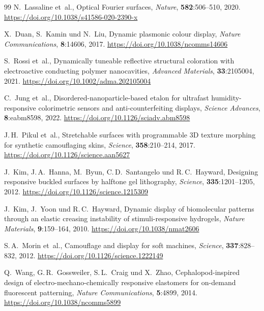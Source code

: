 ﻿\documentclass[a4paper,12pt]{article}
\theoremstyle{definition}
\begin{document}
\begin{thebibliography}{99}
		N.~Lassaline et~al.,
		\newblock Optical {Fourier} surfaces,
		\newblock \emph{Nature}, \textbf{582}:506--510, 2020.
		\newblock \url{https://doi.org/10.1038/s41586-020-2390-x}
		
		X.~Duan, S.~Kamin und N.~Liu,
		\newblock Dynamic plasmonic colour display,
		\newblock \emph{Nature Communications}, \textbf{8}:14606, 2017.
		\newblock \url{https://doi.org/10.1038/ncomms14606}
		
		S.~Rossi et~al.,
		\newblock Dynamically tuneable reflective structural coloration with
		electroactive conducting polymer nanocavities,
		\newblock \emph{Advanced Materials}, \textbf{33}:2105004, 2021.
		\newblock \url{https://doi.org/10.1002/adma.202105004}
		
		C.~Jung et~al.,
		\newblock Disordered-nanoparticle-based etalon for ultrafast
		humidity-responsive colorimetric sensors and anti-counterfeiting displays,
		\newblock \emph{Science Advances}, \textbf{8}:eabm8598, 2022.
		\newblock \url{https://doi.org/10.1126/sciadv.abm8598}
		
		
		J.\,H.~Pikul et~al.,
		\newblock Stretchable surfaces with programmable {3D} texture morphing for
		synthetic camouflaging skins,
		\newblock \emph{Science}, \textbf{358}:210--214, 2017.
		\newblock \url{https://doi.org/10.1126/science.aan5627}
		
		J.~Kim, J.\,A.~Hanna, M.~Byun, C.\,D.~Santangelo und R.\,C.~Hayward,
		\newblock Designing responsive buckled surfaces by halftone gel lithography,
		\newblock \emph{Science}, \textbf{335}:1201--1205, 2012.
		\newblock \url{https://doi.org/10.1126/science.1215309}
		
		J.~Kim, J.~Yoon und R.\,C.~Hayward,
		\newblock Dynamic display of biomolecular patterns through an elastic creasing
		instability of stimuli-responsive hydrogels,
		\newblock \emph{Nature Materials}, \textbf{9}:159--164, 2010.
		\newblock \url{https://doi.org/10.1038/nmat2606}
		
		S.\,A.~Morin et~al.,
		\newblock Camouflage and display for soft machines,
		\newblock \emph{Science}, \textbf{337}:828--832, 2012.
		\newblock \url{https://doi.org/10.1126/science.1222149}
		
		Q.~Wang, G.\,R.~Gossweiler, S.\,L.~Craig und X.~Zhao,
		\newblock Cephalopod-inspired design of electro-mechano-chemically responsive
		elastomers for on-demand fluorescent patterning,
		\newblock \emph{Nature Communications}, \textbf{5}:4899, 2014.
		\newblock \url{https://doi.org/10.1038/ncomms5899}
		

\end{thebibliography}
\end{document}

